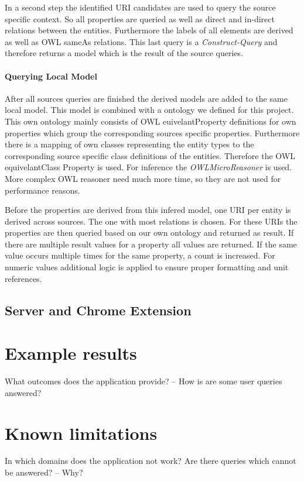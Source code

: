\documentclass[11pt,titlepage,oneside,openany]{article}
\begin{document}
In a second step the identified URI candidates are used to query the source specific context. So all properties are queried as well as direct and in-direct relations between the entities. Furthermore the labels of all elements are derived as well as OWL sameAs relations. 
This last query is a \textit{Construct-Query} and therefore returns a model which is the result of the source queries. 

\paragraph{Querying Local Model}
After all sources queries are finished the derived models are added to the same local model. This model is combined with a ontology we defined for this project. This own ontology mainly consists of OWL euivelantProperty definitions for own properties which group the corresponding sources specific properties. Furthermore there is a mapping of own classes representing the entity types to the corresponding source specific class definitions of the entities. Therefore the OWL equivelantClass Property is used. For inference the \textit{OWLMicroReasoner} is used. More complex OWL reasoner need much more time, so they are not used for performance reasons. 

Before the properties are derived from this infered model, one URI per entity is derived across sources. The one with most relations is chosen. 
For these URIs the properties are then queried based on our own ontology and returned as result. If there are multiple result values for a property all values are returned. If the same value occurs multiple times for the same property, a count is increased. For numeric values additional logic is applied to ensure proper formatting and unit references. 


\subsection{Server and Chrome Extension}



\section{Example results}
What outcomes does the application provide? – How is are some user queries answered? 

\section{Known limitations}
In which domains does the application not work? 
Are there queries which cannot be answered? – Why? 
\end{document}
